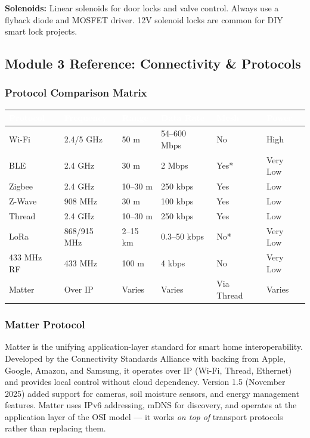 \documentclass[11pt,letterpaper]{article}
\newcommand{\tableheader}[1]{\textbf{\sffamily\textcolor{white}{#1}}}
\begin{document}
\textbf{Solenoids:} Linear solenoids for door locks and valve control. Always use a flyback diode and MOSFET driver. 12V solenoid locks are common for DIY smart lock projects.

\subsection{Module 3 Reference: Connectivity \& Protocols}

\subsubsection{Protocol Comparison Matrix}

\begin{center}
\begin{tabularx}{\textwidth}{L{1.8cm}C{1.5cm}C{1.3cm}C{1.5cm}C{1.3cm}C{1.3cm}}
\toprule
{}
\tableheader{Protocol} & \tableheader{Frequency} & \tableheader{Range} & \tableheader{Data Rate} & \tableheader{Mesh} & \tableheader{Power} \\
\midrule
Wi-Fi & 2.4/5 GHz & 50 m & 54--600 Mbps & No & High \\
BLE & 2.4 GHz & 30 m & 2 Mbps & Yes* & Very Low \\
Zigbee & 2.4 GHz & 10--30 m & 250 kbps & Yes & Low \\
Z-Wave & 908 MHz & 30 m & 100 kbps & Yes & Low \\
Thread & 2.4 GHz & 10--30 m & 250 kbps & Yes & Low \\
LoRa & 868/915 MHz & 2--15 km & 0.3--50 kbps & No* & Very Low \\
433 MHz RF & 433 MHz & 100 m & 4 kbps & No & Very Low \\
Matter & Over IP & Varies & Varies & Via Thread & Varies \\
\bottomrule
\end{tabularx}
\end{center}

\subsubsection{Matter Protocol}

Matter is the unifying application-layer standard for smart home interoperability. Developed by the Connectivity Standards Alliance with backing from Apple, Google, Amazon, and Samsung, it operates over IP (Wi-Fi, Thread, Ethernet) and provides local control without cloud dependency. Version 1.5 (November 2025) added support for cameras, soil moisture sensors, and energy management features. Matter uses IPv6 addressing, mDNS for discovery, and operates at the application layer of the OSI model --- it works \textit{on top of} transport protocols rather than replacing them.
\end{document}
